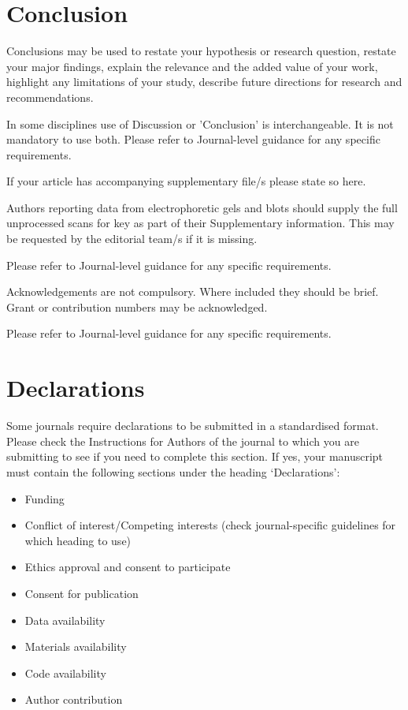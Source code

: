 \documentclass[sn-mathphys-num]{sn-jnl}%
\theoremstyle{thmstyleone}	%
\theoremstyle{thmstyletwo}	%
\theoremstyle{thmstylethree}	%
\begin{document}
\section{Conclusion}\label{sec13}

Conclusions may be used to restate your hypothesis or research question, restate your major findings, explain the relevance and the added value of your work, highlight any limitations of your study, describe future directions for research and recommendations. 

In some disciplines use of Discussion or 'Conclusion' is interchangeable. It is not mandatory to use both. Please refer to Journal-level guidance for any specific requirements. 

\backmatter


If your article has accompanying supplementary file/s please state so here. 

Authors reporting data from electrophoretic gels and blots should supply the full unprocessed scans for key as part of their Supplementary information. This may be requested by the editorial team/s if it is missing.

Please refer to Journal-level guidance for any specific requirements.


Acknowledgements are not compulsory. Where included they should be brief. Grant or contribution numbers may be acknowledged.

Please refer to Journal-level guidance for any specific requirements.

\section*{Declarations}

Some journals require declarations to be submitted in a standardised format. Please check the Instructions for Authors of the journal to which you are submitting to see if you need to complete this section. If yes, your manuscript must contain the following sections under the heading `Declarations':

\begin{itemize}
\item Funding
\item Conflict of interest/Competing interests (check journal-specific guidelines for which heading to use)
\item Ethics approval and consent to participate
\item Consent for publication
\item Data availability 
\item Materials availability
\item Code availability 
\item Author contribution
\end{itemize}
\end{document}
